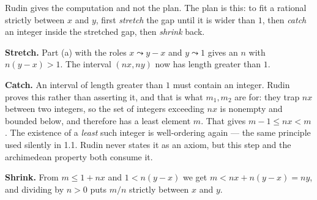\begin{unpack}
Rudin gives the computation and not the plan. The plan is this: to fit a
rational strictly between $x$ and $y$, first \emph{stretch} the gap until it is
wider than $1$, then \emph{catch} an integer inside the stretched gap, then
\emph{shrink} back.

\smallskip
\textbf{Stretch.} Part (a) with the roles $x \leadsto y-x$ and $y \leadsto 1$
gives an $n$ with $n(y-x) > 1$. The interval $(nx, ny)$ now has length greater
than $1$.

\smallskip
\textbf{Catch.} An interval of length greater than $1$ must contain an integer.
Rudin proves this rather than asserting it, and that is what $m_1, m_2$ are for:
they trap $nx$ between two integers, so the set of integers exceeding $nx$ is
nonempty and bounded below, and therefore has a least element $m$. That gives
$m-1 \le nx < m$. The existence of a \emph{least} such integer is well-ordering
again --- the same principle used silently in 1.1. Rudin never states it as an
axiom, but this step and the archimedean property both consume it.

\smallskip
\textbf{Shrink.} From $m \le 1 + nx$ and $1 < n(y-x)$ we get
$m < nx + n(y-x) = ny$, and dividing by $n > 0$ puts $m/n$ strictly between $x$
and $y$.

\medskip
\begin{center}
\end{center}
\end{unpack}
